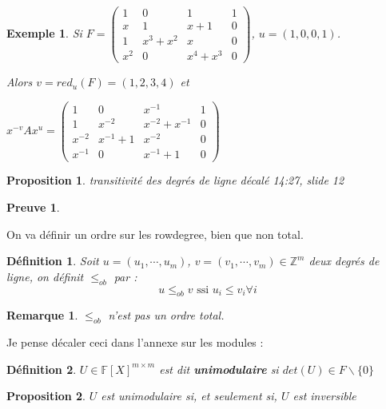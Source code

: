 \documentclass[a4paper,12pt]{report}  %
\theoremstyle{definitionstyle}
\newtheorem{definition}{Définition}[chapter] %
\theoremstyle{examplestyle}
\newtheorem{example}{Exemple}[chapter] %
\theoremstyle{remarkstyle}
\newtheorem{remark}{Remarque}[chapter] %
\theoremstyle{propositionstyle}
\newtheorem{proposition}{Proposition}[chapter]  %
\theoremstyle{theoremstyle}
\theoremstyle{proofstyle}
\newtheorem{preuve}{Preuve}[chapter]  %
\begin{document}
\begin{example}
		Si $F =
	\left(\begin{array}{rrrr}
		1 & 0 & 1 & 1 \\
		x & 1 & x + 1 & 0 \\
		1 & x^{3} + x^{2} & x & 0 \\
		x^{2} & 0 & x^{4} + x^{3} & 0
	\end{array}\right)$, $u = (1, 0, 0, 1)$.

Alors $v = red_u(F) = (1, 2, 3, 4)$ et
	
	$x^{-v} A x^u =
	\left(\begin{array}{rrrr}
		1 & 0 & x^{-1} & 1 \\
		1 & x^{-2} & x^{-2} + x^{-1} & 0 \\
		x^{-2} & x^{-1} + 1 & x^{-2} & 0 \\
		x^{-1} & 0 & x^{-1} + 1 & 0
	\end{array}\right)$
\end{example}
	
\begin{proposition}
	transitivité  des degrés de ligne décalé 14:27, slide 12
\end{proposition}

\begin{preuve}
	
\end{preuve}
	
On va définir un ordre sur les rowdegree, bien que non total.
	
\begin{definition}
	Soit $u = (u_1, \cdots, u_m)$, $v = (v_1, \cdots, v_m) \in \mathbb{Z}^m$ deux degrés de ligne, on définit $\leq_{ob}$ par : 
	$$u \leq_{ob} v \text{ ssi } u_i \leq v_i \forall i$$
\end{definition}
	
\begin{remark}
	$\leq_{ob}$ n'est pas un ordre total.
\end{remark}
	
Je pense décaler ceci dans l'annexe sur les modules :


\begin{definition}
	$U \in \mathbb{F}[X]^{m \times m}$ est dit \textbf{unimodulaire} si $det(U) \in F\backslash\{ 0 \}$
\end{definition}

\begin{proposition}
	$U$ est unimodulaire si, et seulement si, $U$ est inversible
\end{proposition}
\end{document}
